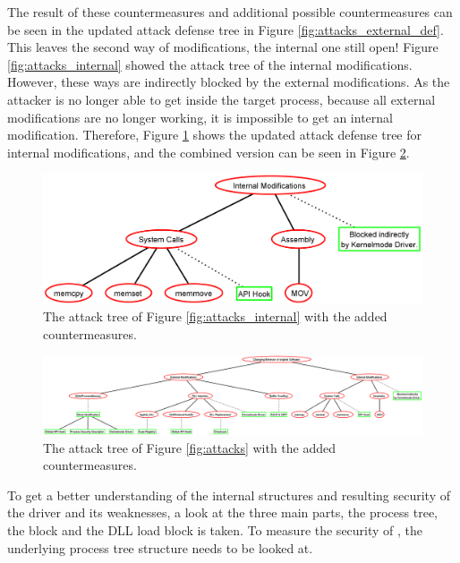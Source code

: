 The result of these countermeasures and additional possible countermeasures can be seen in the updated attack defense tree in Figure \ref{fig:attacks_external_def}. This leaves the second way of modifications, the internal one still open! Figure \ref{fig:attacks_internal} showed the attack tree of the internal modifications. However, these ways are indirectly blocked by the external modifications. As the attacker is no longer able to get inside the target process, because all external modifications are no longer working, it is impossible to get an internal modification. Therefore, Figure \ref{fig:attacks_internal_def} shows the updated attack defense tree for internal modifications, and the combined version can be seen in Figure \ref{fig:attacks_def}.
\begin{figure}[h]
\centering
\includegraphics[scale=0.25]{sections/adtrees/InternalModifications.png}
\caption{The attack tree of Figure \ref{fig:attacks_internal} with the added countermeasures.}
\label{fig:attacks_internal_def}
\end{figure}
\begin{figure}[h]
\centering
\includegraphics[angle=90,scale=0.3]{sections/adtrees/ProcessVirtualMemory.png}
\caption{The attack tree of Figure \ref{fig:attacks} with the added countermeasures.}
\label{fig:attacks_def}
\end{figure}

To get a better understanding of the internal structures and resulting security of the driver and its weaknesses, a look at the three main parts, the process tree, the  block and the DLL load block is taken.
To measure the security of , the underlying process tree structure needs to be looked at. 

